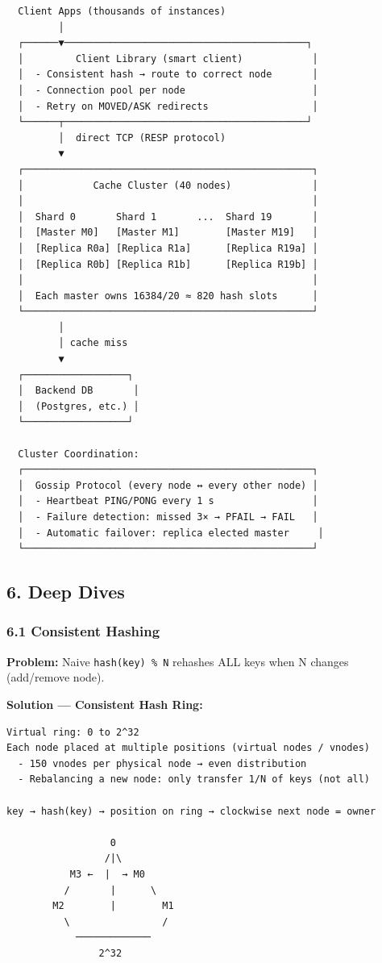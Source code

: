 \documentclass[11pt]{article}
\begin{document}
\begin{verbatim}
  Client Apps (thousands of instances)
         │
  ┌──────▼──────────────────────────────────────────┐
  │         Client Library (smart client)            │
  │  - Consistent hash → route to correct node       │
  │  - Connection pool per node                      │
  │  - Retry on MOVED/ASK redirects                  │
  └──────┬──────────────────────────────────────────┘
         │  direct TCP (RESP protocol)
         ▼
  ┌──────────────────────────────────────────────────┐
  │            Cache Cluster (40 nodes)              │
  │                                                  │
  │  Shard 0       Shard 1       ...  Shard 19       │
  │  [Master M0]   [Master M1]        [Master M19]   │
  │  [Replica R0a] [Replica R1a]      [Replica R19a] │
  │  [Replica R0b] [Replica R1b]      [Replica R19b] │
  │                                                  │
  │  Each master owns 16384/20 ≈ 820 hash slots      │
  └──────────────────────────────────────────────────┘
         │
         │ cache miss
         ▼
  ┌──────────────────┐
  │  Backend DB       │
  │  (Postgres, etc.) │
  └──────────────────┘

  Cluster Coordination:
  ┌──────────────────────────────────────────────────┐
  │  Gossip Protocol (every node ↔ every other node) │
  │  - Heartbeat PING/PONG every 1 s                 │
  │  - Failure detection: missed 3× → PFAIL → FAIL   │
  │  - Automatic failover: replica elected master     │
  └──────────────────────────────────────────────────┘
\end{verbatim}

\subsection{6. Deep Dives}\label{6-deep-dives-2}

\subsubsection{6.1 Consistent Hashing}\label{61-consistent-hashing}

\textbf{Problem:} Naive \texttt{hash(key)\ \%\ N} rehashes ALL keys when N changes (add/remove node).

\textbf{Solution --- Consistent Hash Ring:}

\setcodelang{}

\begin{verbatim}
Virtual ring: 0 to 2^32
Each node placed at multiple positions (virtual nodes / vnodes)
  - 150 vnodes per physical node → even distribution
  - Rebalancing a new node: only transfer 1/N of keys (not all)

key → hash(key) → position on ring → clockwise next node = owner

                  0
                 /|\
           M3 ←  |  → M0
          /       |      \
        M2        |        M1
          \                /
            ─────────────
                2^32
\end{verbatim}
\end{document}
